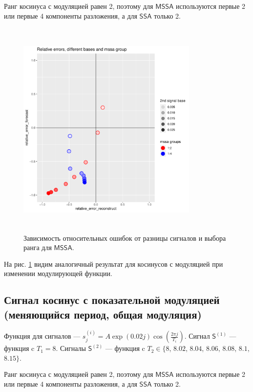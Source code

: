 \documentclass[specialist, substylefile = spbureport.rtx,
    subf,href,colorlinks=true, 12pt]{disser}
\newcommand{\sfS}{\mathsf{S}}
\newcommand{\SSA}{\mathsf{SSA}}
\newcommand{\MSSA}{\mathsf{MSSA}}
\begin{document}
        Ранг косинуса с модуляцией равен 2, поэтому для $\MSSA$ используются первые 2 или первые 4 компоненты разложения, а для $\SSA$ только 2.

        \begin{figure}[h]
            \centering
            \includegraphics[height=11cm, width=0.8\textwidth]{experiment_1_expcos1.pdf}
            \caption{Зависимость относительных ошибок от разницы сигналов и выбора ранга для $\MSSA$.}
            \label{fig:exp1_expcos1}
        \end{figure}

        На рис. \ref{fig:exp1_expcos1} видим аналогичный результат для косинусов с модуляцией при изменении модулирующей функции.

    \subsection{Сигнал косинус с показательной модуляцией (меняющийся период, общая модуляция)}
        Функция для сигналов --- $s^{(i)}_j = A \exp(0.02j) \cos(\frac{2\pi j}{T_i})$.
        Сигнал $\sfS^{(1)}$ --- функция c $T_1 = 8$.
        Сигналы $\sfS^{(2)}$ --- функция c $T_2 \in \{8$, $8.02$, $8.04$, $8.06$, $8.08$, $8.1$, $8.15\}$.

        Ранг косинуса с модуляцией равен 2, поэтому для $\MSSA$ используются первые 2 или первые 4 компоненты разложения, а для $\SSA$ только 2.
\end{document}
